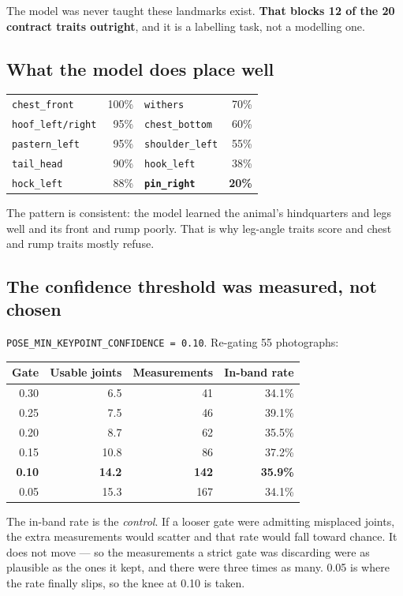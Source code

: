 \documentclass[11pt,a4paper]{article}
\newcommand{\bad}[1]{{\color{invented}\textbf{#1}}}
\begin{document}
The model was never taught these landmarks exist. \textbf{That blocks 12 of the
20 contract traits outright}, and it is a labelling task, not a modelling one.

\subsection*{What the model does place well}

\begin{tabular}{@{}lr@{\hspace{2.2em}}lr@{}}
\toprule
\texttt{chest\_front} & 100\% & \texttt{withers} & 70\% \\
\texttt{hoof\_left/right} & 95\% & \texttt{chest\_bottom} & 60\% \\
\texttt{pastern\_left} & 95\% & \texttt{shoulder\_left} & 55\% \\
\texttt{tail\_head} & 90\% & \texttt{hook\_left} & 38\% \\
\texttt{hock\_left} & 88\% & \bad{\texttt{pin\_right}} & \bad{20\%} \\
\bottomrule
\end{tabular}

The pattern is consistent: the model learned the animal's hindquarters and legs
well and its front and rump poorly. That is why leg-angle traits score and
chest and rump traits mostly refuse.

\subsection*{The confidence threshold was measured, not chosen}

\texttt{POSE\_MIN\_KEYPOINT\_CONFIDENCE = 0.10}. Re-gating 55 photographs:

\begin{tabular}{@{}rrrr@{}}
\toprule
\textbf{Gate} & \textbf{Usable joints} & \textbf{Measurements} & \textbf{In-band rate} \\
\midrule
0.30 & 6.5 & 41 & 34.1\% \\
0.25 & 7.5 & 46 & 39.1\% \\
0.20 & 8.7 & 62 & 35.5\% \\
0.15 & 10.8 & 86 & 37.2\% \\
\textbf{0.10} & \textbf{14.2} & \textbf{142} & \textbf{35.9\%} \\
0.05 & 15.3 & 167 & 34.1\% \\
\bottomrule
\end{tabular}

The in-band rate is the \emph{control}. If a looser gate were admitting
misplaced joints, the extra measurements would scatter and that rate would fall
toward chance. It does not move --- so the measurements a strict gate was
discarding were as plausible as the ones it kept, and there were three times as
many. 0.05 is where the rate finally slips, so the knee at 0.10 is taken.
\end{document}

